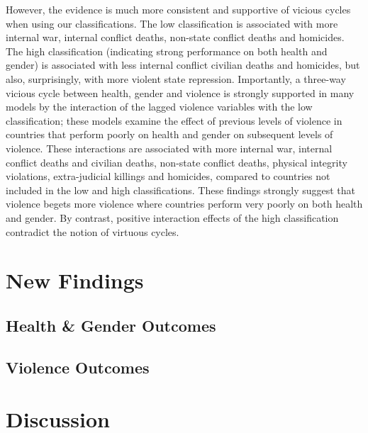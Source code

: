 \documentclass[12pt]{article}
\begin{document}
However, the evidence is much more consistent and supportive of vicious cycles when using our classifications. The low classification is associated with more internal war, internal conflict deaths, non-state conflict deaths and homicides. The high classification (indicating strong performance on both health and gender) is associated with less internal conflict civilian deaths and homicides, but also, surprisingly, with more violent state repression. Importantly, a three-way vicious cycle between health, gender and violence is strongly supported in many models by the interaction of the lagged violence variables with the low classification; these models examine the effect of previous levels of violence in countries that perform poorly on health and gender on subsequent levels of violence. These interactions are associated with more internal war, internal conflict deaths and civilian deaths, non-state conflict deaths, physical integrity violations, extra-judicial killings and homicides, compared to countries not included in the low and high classifications. These findings strongly suggest that violence begets more violence where countries perform very poorly on both health and gender. By contrast, positive interaction effects of the high classification contradict the notion of virtuous cycles.

\section{New Findings}


\subsection{Health \& Gender Outcomes}

\subsection{Violence Outcomes}

\section{Discussion}

\end{document}
